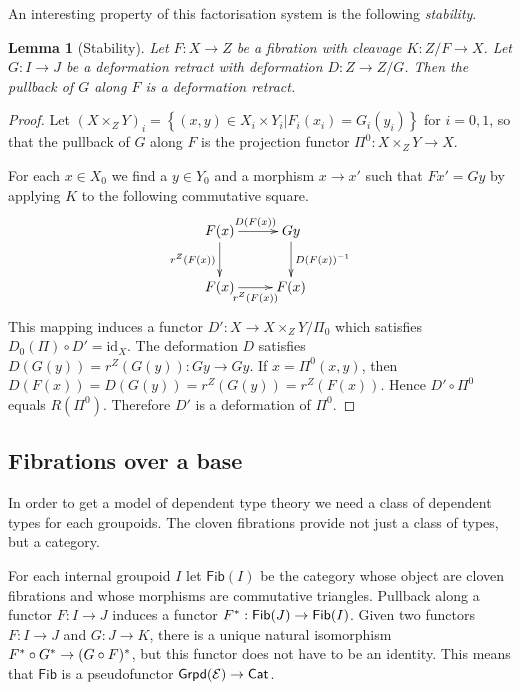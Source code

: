 \documentclass{amsart}
\theoremstyle{plain}
\newtheorem{lemma}[theorem]{Lemma}
\theoremstyle{definition}
\newcommand\hide[1]{}
\newcommand\cat\mathcal
\newcommand\set[1]{\left\{#1\right\}}
\newcommand\id{\mathrm{id}}
\begin{document}
An interesting property of this factorisation system is the following \emph{stability}.

\begin{lemma}[Stability] Let $F:X\to Z$ be a fibration with cleavage $K: Z/F \to X$. Let $G:I\to J$ be a deformation retract with deformation $D:Z\to Z/G$. Then the pullback of $G$ along $F$ is a deformation retract. \end{lemma}\hide{pullbacks van functoren\dots}

\hide{Dit is een veel makkelijker manier om te bewijzen dat fibraties onder producten gesloten zijn. Het moet daarom werken!}

\begin{proof} Let $(X\times_Z Y)_i = \set{(x,y)\in X_i\times Y_i| F_i(x_i) = G_i(y_i)}$ for $i=0,1$, so that the pullback of $G$ along $F$ is the projection functor $\Pi^0:X\times_Z Y \to X$.

For each $x\in X_0$ we find a $y\in Y_0$ and a morphism $x \to x'$ such that $Fx'= Gy$ by applying $K$ to the following commutative square.
\[ \xymatrix{
F(x) \ar[r]^{D(F(x))}\ar[d]_{r^Z(F(x))} & Gy\ar[d]^{D(F(x))^{-1}} \\
F(x) \ar[r]_{r^Z(F(x))} & F(x)
}\]
This mapping induces a functor $D':X \to X\times_ZY/\Pi_0$ which satisfies $D_0(\Pi)\circ D' = \id_X$. The deformation $D$ satisfies $D(G(y)) = r^Z(G(y)):Gy \to Gy$. If $x = \Pi^0(x,y)$, then $D(F(x)) = D(G(y)) = r^Z(G(y)) = r^Z(F(x))$. Hence $D'\circ \Pi^0$ equals $R(\Pi^0)$. Therefore $D'$ is a deformation of $\Pi^0$.
\end{proof}


\newcommand\fib{\mathsf{Fib}}
\subsection{Fibrations over a base}
In order to get a model of dependent type theory we need a class of dependent types for each groupoids. The cloven fibrations provide not just a class of types, but a category.

For each internal groupoid $I$ let $\fib(I)$ be the category whose object are cloven fibrations and whose morphisms are commutative triangles. Pullback along a functor $F:I\to J$ induces a functor $F\ri:\fib(J) \to \fib(I)$. Given two functors $F:I\to J$ and $G:J\to K$, there is a unique natural isomorphism $F^*\circ G^* \to (G\circ F)^*$, but this functor does not have to be an identity. This means that $\fib$ is a pseudofunctor $\grpd(\cat E) \to \mathsf{Cat}$.
\end{document}
